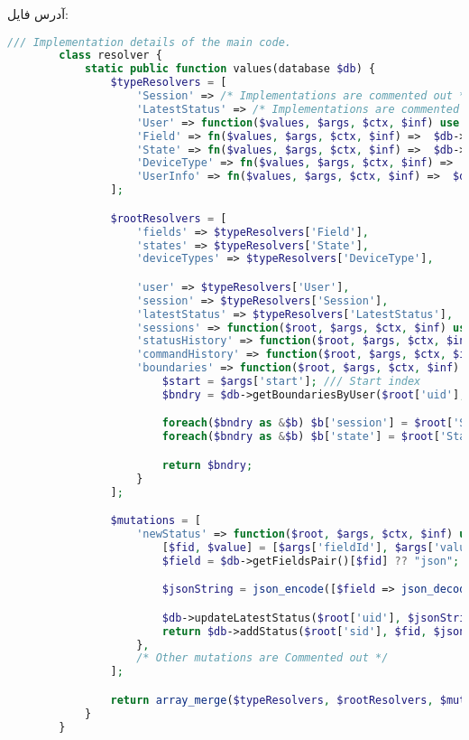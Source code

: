 آدرس فایل:
\hyperref{https://github.com/cardianco/cardian-server/blob/master/src/api/graphql/resolver.graphql}{}{}{}
\begin{latin}
	\small
	\begin{lstlisting}[language=php, caption={Rsolver Class}]
		/// Implementation details of the main code.
		class resolver {
			static public function values(database $db) {
				$typeResolvers = [
					'Session' => /* Implementations are commented out */ ,
					'LatestStatus' => /* Implementations are commented out */,
					'User' => function($values, $args, $ctx, $inf) use ($db) { /* Commented out */ },
					'Field' => fn($values, $args, $ctx, $inf) =>  $db->getFields($values['fid'] ?? null),
					'State' => fn($values, $args, $ctx, $inf) =>  $db->getStates($values['stid'] ?? null),
					'DeviceType' => fn($values, $args, $ctx, $inf) =>  $db->getDeviceType($values['tid'] ?? null),
					'UserInfo' => fn($values, $args, $ctx, $inf) =>  $db->getUserInfo($values['id'])
				];

				$rootResolvers = [
					'fields' => $typeResolvers['Field'],
					'states' => $typeResolvers['State'],
					'deviceTypes' => $typeResolvers['DeviceType'],

					'user' => $typeResolvers['User'],
					'session' => $typeResolvers['Session'],
					'latestStatus' => $typeResolvers['LatestStatus'],
					'sessions' => function($root, $args, $ctx, $inf) use ($db) { /* Commented out */  },
					'statusHistory' => function($root, $args, $ctx, $inf) use ($db) { /* Commented out */  },
					'commandHistory' => function($root, $args, $ctx, $inf) use ($db) { /* Commented out */  },
					'boundaries' => function($root, $args, $ctx, $inf) use ($db) {
						$start = $args['start']; /// Start index
						$bndry = $db->getBoundariesByUser($root['uid'], $start);

						foreach($bndry as &$b) $b['session'] = $root['Session'];
						foreach($bndry as &$b) $b['state'] = $root['State'];

						return $bndry;
					}
				];

				$mutations = [
					'newStatus' => function($root, $args, $ctx, $inf) use ($db) {
						[$fid, $value] = [$args['fieldId'], $args['value']];
						$field = $db->getFieldsPair()[$fid] ?? "json";

						$jsonString = json_encode([$field => json_decode($value)]);

						$db->updateLatestStatus($root['uid'], $jsonString);
						return $db->addStatus($root['sid'], $fid, $jsonString);
					},
					/* Other mutations are Commented out */
				];

				return array_merge($typeResolvers, $rootResolvers, $mutations);
			}
		}
	\end{lstlisting}
\end{latin}

